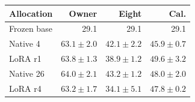 \begin{tabular}{@{}lrrr@{}}
\toprule
Allocation & Owner & Eight & Cal.\\
\midrule
Frozen base & 29.1 & 29.1 & 29.1\\
Native 4 & $63.1\pm2.0$ & $42.1\pm2.2$ & $45.9\pm0.7$\\
LoRA r1 & $63.8\pm1.3$ & $38.9\pm1.2$ & $49.6\pm3.2$\\
Native 26 & $64.0\pm2.1$ & $43.2\pm1.2$ & $48.0\pm2.0$\\
LoRA r4 & $63.2\pm1.7$ & $34.1\pm5.1$ & $47.8\pm0.2$\\
\bottomrule
\end{tabular}
